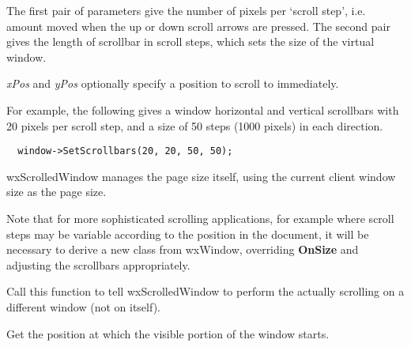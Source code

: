 





The first pair of parameters give the number of pixels per `scroll step', i.e. amount
moved when the up or down scroll arrows are pressed.
The second pair gives the length of scrollbar in scroll steps, which sets the size of the virtual
window.

{\it xPos} and {\it yPos} optionally specify a position to scroll to immediately.

For example, the following gives a window horizontal and vertical
scrollbars with 20 pixels per scroll step, and a size of 50 steps (1000
pixels) in each direction.

\begin{verbatim}
  window->SetScrollbars(20, 20, 50, 50);
\end{verbatim}

wxScrolledWindow manages the page size itself,
using the current client window size as the page size.

Note that for more sophisticated scrolling applications, for example where
scroll steps may be variable according to the position in the document, it will be
necessary to derive a new class from wxWindow, overriding {\bf OnSize} and
adjusting the scrollbars appropriately.

\label{wxscrolledwindowsettargetwindow}


Call this function to tell wxScrolledWindow to perform the actually scrolling on
a different window (not on itself).

\label{wxscrolledwindowgetviewstart}


Get the position at which the visible portion of the window starts.


